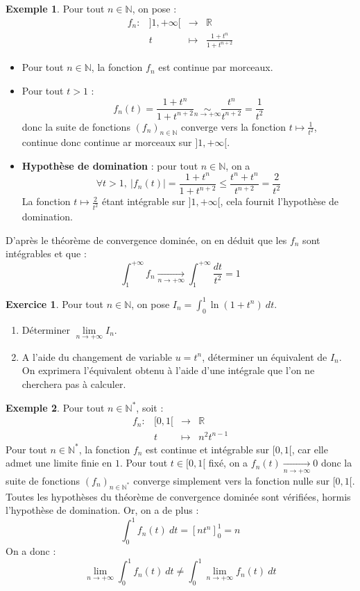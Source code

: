 \documentclass[french]{article}
\newcommand{\N}{\mathbb{N}}
\newcommand{\R}{\mathbb{R}}
\newcommand{\st}{^*}
\theoremstyle{plain}
\theoremstyle{definition}
\newtheorem*{ex}{Exemple}
\newtheorem{exo}{Exercice}
\theoremstyle{remark}
\begin{document}
\begin{ex}
	Pour tout $n\in\N$, on pose : $$\begin{array}{lrcl}
		f_n:&]1,+\infty[&\longrightarrow&\R\\
		&t&\longmapsto&\displaystyle\frac{1+t^n}{1+t^{n+2}}
	\end{array}$$
	\begin{itemize}
		\item Pour tout $n\in\N$, la fonction $f_n$ est continue par morceaux.
		\item Pour tout $t>1$ : $$f_n(t)=\displaystyle\frac{1+t^n}{1+t^{n+2}}\underset{n\to +\infty}{\sim}\frac{t^n}{t^{n+2}}=\frac{1}{t^2}$$ donc la suite de fonctions $(f_n)_{n\in\N}$ converge vers la fonction $t\mapsto\displaystyle\frac{1}{t^2}$, continue donc continue ar morceaux sur $]1,+\infty[$.
		\item \textbf{Hypothèse de domination} : pour tout $n\in\N$, on a $$\forall t>1,\ \lvert f_n(t)\rvert=\displaystyle\frac{1+t^n}{1+t^{n+2}}\leqslant\frac{t^n+t^n}{t^{n+2}}=\frac{2}{t^2}$$ La fonction $t\mapsto\displaystyle\frac{2}{t^2}$ étant intégrable sur $]1,+\infty[$, cela fournit l'hypothèse de domination.
	\end{itemize}
	D'après le théorème de convergence dominée, on en déduit que les $f_n$ sont intégrables et que : $$\int_{1}^{+\infty}f_n\xrightarrow[n\to+\infty]{}\int_{1}^{+\infty}\frac{dt}{t^2}=1$$
\end{ex}

\begin{exo}
	Pour tout $n\in\N$, on pose $\displaystyle I_n=\int_{0}^{1}\ln(1+t^n)\ dt$.
	\begin{enumerate}
		\item Déterminer $\underset{n\to+\infty}{\lim} I_n$.
		\item A l'aide du changement de variable $u=t^n$, déterminer un équivalent de $I_n$. On exprimera l'équivalent obtenu à l'aide d'une intégrale que l'on ne cherchera pas à calculer.
	\end{enumerate}
\end{exo}

\begin{ex}
	Pour tout $n\in\N\st$, soit : $$\begin{array}{lrcl}
		f_n:&[0,1[&\longrightarrow&\R\\
		&t&\longmapsto&n^2t^{n-1}
	\end{array}$$ Pour tout $n\in\N\st$, la fonction $f_n$ est continue et intégrable sur $[0,1[$, car elle admet une limite finie en $1$. Pour tout $t\in[0,1[$ fixé, on a $f_n(t)\xrightarrow[n\to+\infty]{}0$ donc la suite de fonctions $(f_n)_{n\in\N\st}$ converge simplement vers la fonction nulle sur $[0,1[$. Toutes les hypothèses du théorème de convergence dominée sont vérifiées, hormis l'hypothèse de domination. Or, on a de plus : $$\int_{0}^{1}f_n(t)\ dt=[nt^n]_{0}^{1}=n$$ On a donc : $$\underset{n\to+\infty}{\lim}\int_{0}^{1}f_n(t)\ dt\ne \int_{0}^{1}\underset{n\to+\infty}{\lim}f_n(t)\ dt$$
\end{ex}
\end{document}
